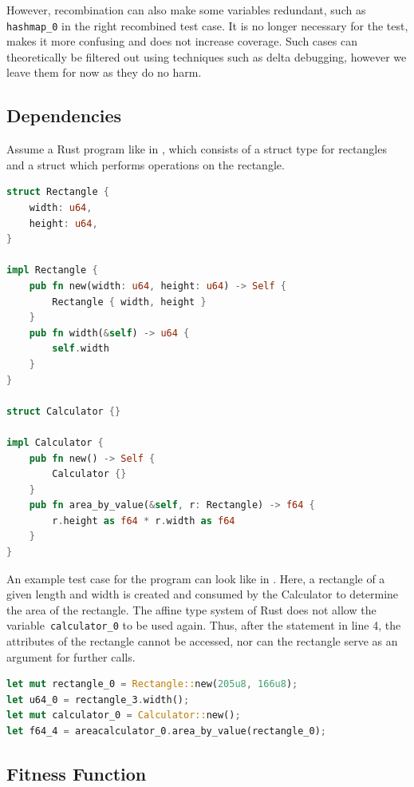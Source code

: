 \documentclass[paper=a4,%
  twoside,%
  BCOR4mm,%
  abstract=true,%
  toc=bibliography,%
  chapterprefix=true,%
  toc=bibliographynumbered,%
  open=right,%
  english,%
  pagesize=pdftex]{scrreprt}
\begin{document}
However, recombination can also make some variables redundant, such as \lstinline{hashmap_0} in the right recombined test case. It is no longer necessary for the test, makes it more confusing and does not increase coverage. Such cases can theoretically be filtered out using techniques such as delta debugging, however we leave them for now as they do no harm.

\subsection{Dependencies}
Assume a Rust program like in , which consists of a struct type for rectangles and a struct which performs operations on the rectangle.
\begin{lstlisting}[language=Rust, style=boxed, caption={Rectangle data type}, label=lst:example-rust-program]
struct Rectangle {
    width: u64,
    height: u64,
}

impl Rectangle {
    pub fn new(width: u64, height: u64) -> Self {
        Rectangle { width, height }
    }
    pub fn width(&self) -> u64 {
        self.width
    }
}

struct Calculator {}

impl Calculator {
    pub fn new() -> Self {
        Calculator {}
    }
    pub fn area_by_value(&self, r: Rectangle) -> f64 {
        r.height as f64 * r.width as f64
    }
}
\end{lstlisting}

An example test case for the program can look like in . Here, a rectangle of a given length and width is created and consumed by the Calculator to determine the area of the rectangle. The affine type system of Rust does not allow the variable~\lstinline{calculator_0} to be used again. Thus, after the statement in line 4, the attributes of the rectangle cannot be accessed, nor can the rectangle serve as an argument for further calls.

\begin{lstlisting}[language=Rust, style=boxed, caption={Ein Beispiel Testcase, generiert für das Program in \Cref{lst:example-rust-program}}, label=lst:example-testcase]
let mut rectangle_0 = Rectangle::new(205u8, 166u8);
let u64_0 = rectangle_3.width();
let mut calculator_0 = Calculator::new();
let f64_4 = areacalculator_0.area_by_value(rectangle_0);
\end{lstlisting}


\subsection{Fitness Function}
\end{document}
